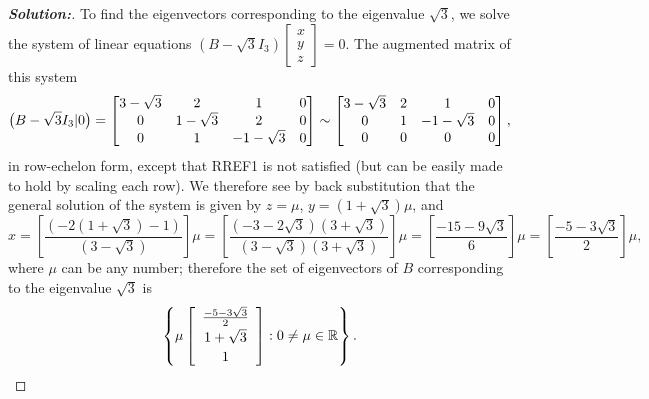 \documentclass[a4paper]{amsart}
\theoremstyle{definition}
\newenvironment{solution}{\begin{proof}[\textbf{Solution:}] \vphantom{u}}{\end{proof}}
\begin{document}
\begin{solution}
 To find the eigenvectors corresponding to the eigenvalue
 $\sqrt{3}$, we solve the system of linear equations $(B -
 \sqrt{3}I_3)\left[
 \begin{array}{c}x \\ y\\z
 \end{array} \right] = 0$. The augmented matrix of this system
 \[
 \big(B - \sqrt{3}I_3|0\big) = \left[\begin{matrix} 3-\sqrt{3}& 2&
 1&0\\0&1-\sqrt{3}&2&0\\0&1&-1-\sqrt{3}&0\end{matrix}\right] \sim
 \left[\begin{matrix} 3-\sqrt{3}& 2&
 1&0\\0&1&-1-\sqrt{3}&0\\0&0&0&0\end{matrix}\right],
 \]
 in row-echelon form, except that RREF1 is not satisfied (but
 can be easily made to hold by scaling each row).
 We therefore see by back substitution that
 the general solution of the system is given by $z = \mu$, $y =
 (1+\sqrt{3})\mu$, and
 \[
 {\textstyle x =
 \left[\frac{(-2(1+\sqrt{3})-1)}{(3-\sqrt{3})}\right]\mu =
 \left[\frac{(-3
 -2\sqrt{3})(3+\sqrt{3})}{(3-\sqrt{3})(3+\sqrt{3})}\right]\mu =
 \left[\frac{-15-9\sqrt{3}}{6}\right]\mu =
 \left[\frac{-5-3\sqrt{3}}{2}\right]\mu,}
 \]
 where $\mu$ can be any number; therefore the set of eigenvectors
 of $B$ corresponding to the eigenvalue $\sqrt{3}$ is
 \[
 \left\{ \mu \left[ \begin{array}{c}
 \frac{-5-3\sqrt{3}}{2}\\[2pt]1+\sqrt{3}\\[2pt]1
 \end{array} \right] : 0 \neq \mu \in {\mathbb{R}} \right\}.
 \]


\end{solution}
\end{document}

